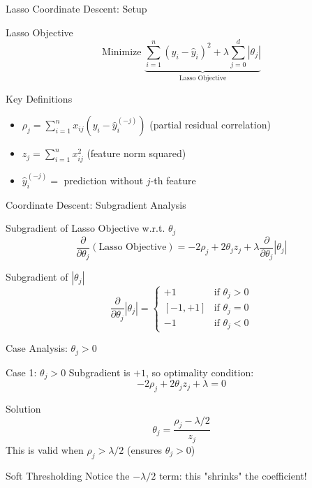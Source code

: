 \documentclass{beamer}
\begin{document}
\begin{frame}{Lasso Coordinate Descent: Setup}
\begin{codebox}{Lasso Objective}
$$\text{Minimize } \underbrace{\sum_{i=1}^{n} (y_i - \hat{y}_i)^{2} + \lambda \sum_{j=0}^{d} |\theta_{j}|}_{\text{Lasso Objective}}$$
\end{codebox}
\pause

\begin{keypointsbox}{Key Definitions}
\begin{itemize}
\item $\rho_j = \sum_{i=1}^{n} x_{ij}(y_i - \hat{y}_i^{(-j)})$ (partial residual correlation)
\item $z_j = \sum_{i=1}^{n} x_{ij}^2$ (feature norm squared)
\item $\hat{y}_i^{(-j)} = $ prediction without $j$-th feature
\end{itemize}
\end{keypointsbox}
\end{frame}

\begin{frame}{Coordinate Descent: Subgradient Analysis}
\begin{codebox}{Subgradient of Lasso Objective w.r.t. $\theta_j$}
$$\frac{\partial}{\partial \theta_{j}}(\text{Lasso Objective}) = -2\rho_{j} + 2\theta_{j}z_{j} + \lambda \frac{\partial}{\partial \theta_{j}}|\theta_{j}|$$
\end{codebox}
\pause

\begin{theorembox}{Subgradient of $|\theta_j|$}
$$\frac{\partial}{\partial \theta_{j}}|\theta_{j}| = \begin{cases}
+1 & \text{if } \theta_{j} > 0 \\
[-1,+1] & \text{if } \theta_{j} = 0 \\
-1 & \text{if } \theta_{j} < 0
\end{cases}$$
\end{theorembox}
\end{frame}

\begin{frame}{Case Analysis: $\theta_j > 0$}
\begin{codebox}{Case 1: $\theta_j > 0$}
Subgradient is $+1$, so optimality condition:
$$-2\rho_j + 2\theta_j z_j + \lambda = 0$$
\end{codebox}
\pause

\begin{theorembox}{Solution}
$$\theta_j = \frac{\rho_j - \lambda/2}{z_j}$$
This is valid when $\rho_j > \lambda/2$ (ensures $\theta_j > 0$)
\end{theorembox}
\pause

\begin{alertbox}{Soft Thresholding}
Notice the $-\lambda/2$ term: this "shrinks" the coefficient!
\end{alertbox}
\end{frame}
\end{document}
